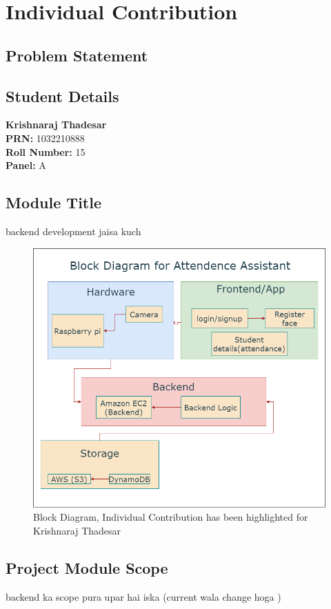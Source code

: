\documentclass[openany]{report}
\begin{document}
\chapter{Individual Contribution}
\section{Problem Statement}
\section{Student Details}
\textbf{Krishnaraj Thadesar} \\
\textbf{PRN:} 1032210888 \\
\textbf{Roll Number:} 15 \\
\textbf{Panel:} A \\
\section{Module Title}
backend development  jaisa kuch
\begin{figure}[H]
    \centering
    \includegraphics[width=.95\textwidth]{../imgs/block diagram.png}
    \caption{Block Diagram, Individual Contribution has been highlighted for Krishnaraj Thadesar}
    \label{fig:block_diagram}
\end{figure}
\section{Project Module Scope}
backend ka scope pura upar hai iska (current wala change hoga )
\end{document}
